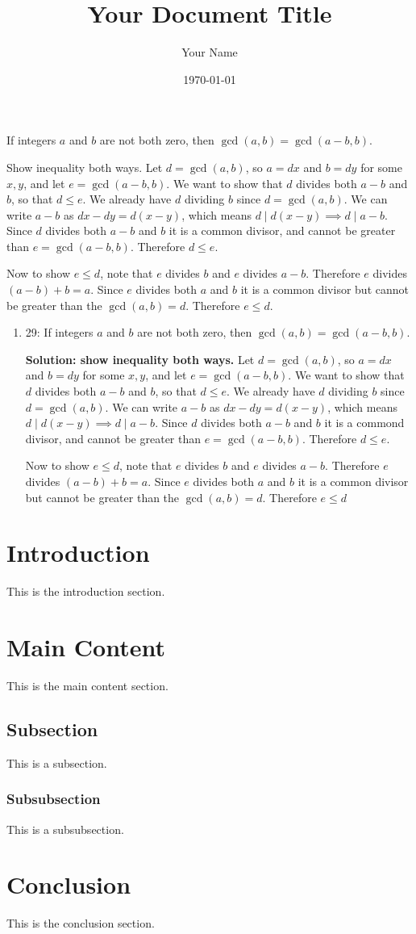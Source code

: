 \documentclass{article}
\title{Your Document Title}
\author{Your Name}
\date{\today} %
\begin{document}
\maketitle

\begin{problem}
If integers $a$ and $b$ are not both zero, then $\gcd(a,b)=\gcd(a-b,b)$.
\end{problem}

\begin{solution}
    Show inequality both ways. Let $d = \gcd(a, b)$, so $a = dx$ and $b = dy$ for some $x, y$, and let $e = \gcd(a - b, b)$. We want to show that $d$ divides both $a - b$ and $b$, so that $d \leq e$. We already have $d$ dividing $b$ since $d = \gcd(a, b)$. We can write $a - b$ as $dx - dy = d(x-y)$, which means $d\mid d(x-y) \implies d\mid a-b$. Since $d$ divides both $a-b$ and $b$ it is a common divisor, and cannot be greater than $e = \gcd(a-b, b)$. Therefore $d \leq e$. 
    
    Now to show $e \leq d$, note that $e$ divides $b$ and $e$ divides $a - b$. Therefore $e$ divides $(a - b) + b = a$. Since $e$ divides both $a$ and $b$ it is a common divisor but cannot be greater than the $\gcd(a, b) = d$. Therefore $e \leq d$.
\end{solution}

\begin{enumerate}
    \item 29: If integers $a$ and $b$ are not both zero, then $\gcd(a,b)=\gcd(a-b,b)$.
    
    \textbf{Solution: show inequality both ways.} Let $d = \gcd(a, b)$, so $a = dx$ and $b = dy$ for some $x, y$, and let $e = \gcd(a - b, b)$. We want to show that $d$ divides both $a - b$ and $b$, so that $d \leq e$. We already have $d$ dividing $b$ since $d = \gcd(a, b)$. We can write $a - b$ as $dx - dy = d(x-y)$, which means $d\mid d(x-y) \implies d\mid a-b$. Since $d$ divides both $a-b$ and $b$ it is a commond divisor, and cannot be greater than $e = \gcd(a-b, b)$. Therefore $d \leq e$. 

    Now to show $e \leq d$, note that $e$ divides $b$ and $e$ divides $a - b$. Therefore $e$ divides $(a - b) + b = a$. Since $e$ divides both $a$ and $b$ it is a common divisor but cannot be greater than the $\gcd(a, b) = d$. Therefore $e \leq d$
\end{enumerate}
\section{Introduction}
This is the introduction section.

\section{Main Content}
This is the main content section.

\subsection{Subsection}
This is a subsection.

\subsubsection{Subsubsection}
This is a subsubsection.

\section{Conclusion}
This is the conclusion section.
\end{document}
